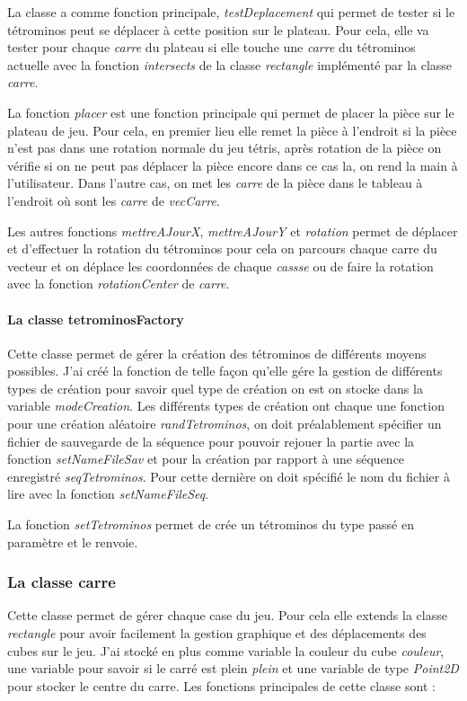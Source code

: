 \documentclass{article}           %
\begin{document}
La classe a comme fonction principale, \emph{testDeplacement} qui permet de tester si le tétrominos peut se déplacer à cette position sur le plateau. Pour cela, elle va tester pour chaque \emph{carre} du plateau si elle touche une \emph{carre} du tétrominos actuelle avec la fonction \emph{intersects} de la classe \emph{rectangle} implémenté par la classe \emph{carre}.

La fonction \emph{placer} est une fonction principale qui permet de placer la pièce sur le plateau de jeu. Pour cela, en premier lieu elle remet la pièce à l'endroit si la pièce n'est pas dans une rotation normale du jeu tétris, après rotation de la pièce on vérifie si on ne peut pas déplacer la pièce encore dans ce cas la, on rend la main à l'utilisateur. Dans l'autre cas, on met les \emph{carre} de la pièce dans le tableau à l'endroit où sont les \emph{carre} de \emph{vecCarre}.

Les autres fonctions \emph{mettreAJourX}, \emph{mettreAJourY} et \emph{rotation} permet de déplacer et d'effectuer la rotation du tétrominos pour cela on parcours chaque carre du vecteur et on déplace les coordonnées de chaque \emph{cassse} ou de faire la rotation avec la fonction \emph{rotationCenter} de \emph{carre}.

\paragraph{La classe tetrominosFactory}
Cette classe permet de gérer la création des tétrominos de différents moyens possibles. J'ai créé la fonction de telle façon qu'elle gére la gestion de différents types de création pour savoir quel type de création on est on stocke dans la variable \emph{modeCreation}. Les différents types de création ont chaque une fonction pour une création aléatoire \emph{randTetrominos}, on doit préalablement spécifier un fichier de sauvegarde de la séquence pour pouvoir rejouer la partie avec la fonction \emph{setNameFileSav} et pour la création par rapport à une séquence enregistré \emph{seqTetrominos}.
Pour cette dernière on doit spécifié le nom du fichier à lire avec la fonction \emph{setNameFileSeq}.

La fonction \emph{setTetrominos} permet de crée un tétrominos du type passé en paramètre et le renvoie.

\subsubsection{La classe carre}
Cette classe permet de gérer chaque case du jeu. Pour cela elle extends la classe \emph{rectangle} pour avoir facilement la gestion graphique et des déplacements des cubes sur le jeu.
J'ai stocké en plus comme variable la couleur du cube \emph{couleur}, une variable pour savoir si le carré est plein \emph{plein} et une variable de type \emph{Point2D} pour stocker le centre du carre. Les fonctions principales de cette classe sont :
\end{document}
